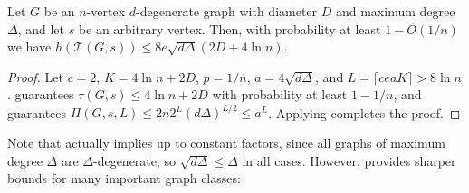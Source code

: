\documentclass{patmorin}
\newcommand{\tcal}{\mathcal{T}}
\begin{document}


\begin{thm}
  Let $G$ be an $n$-vertex $d$-degenerate graph with diameter $D$ and
  maximum degree $\Delta$, and let $s$ be an arbitrary vertex. 
  Then, with probability at least $1-O(1/n)$ we have
  $h(\tcal(G,s)) \leq 8e \sqrt{d\Delta}(2D+4\ln n)$.
\end{thm}

\begin{proof}
Let $c=2$, $K=4\ln n + 2D$, $p=1/n$, $a=4\sqrt{d\Delta}$, and $L=\lceil cea K\rceil > 8 \ln n$.
 guarantees
$\tau(G,s) \leq 4 \ln n + 2 D$ with probability at least
$1-1/n$,
and  guarantees
$\Pi(G,s,L) \leq 2n2^{L}(d\Delta)^{L/2} \leq a^L$.
Applying  completes the proof.
\end{proof}



Note that  actually implies
 up to constant factors, since all graphs of maximum degree $\Delta$
are $\Delta$-degenerate, so $\sqrt{d\Delta}\le \Delta$ in all cases.
However,  provides sharper bounds for  many important graph classes:
\end{document}
